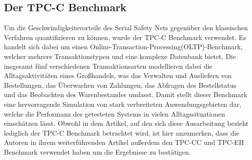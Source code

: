 \subsection{Der TPC-C Benchmark}
Um die Geschwindigkeitsvorteile des Serial Safety Nets gegenüber den klassischen Verfahren quantifizieren zu können, wurde der TPC-C Benchmark verwendet.\cite{tpcc}
Es handelt sich dabei um einen Online-Transaction-Processing(OLTP)-Benchmark, welcher mehrere Transaktionstypen und eine komplexe Datenbank bietet.
Die insgesamt fünf verschiedenen Transaktionsarten modellieren dabei die Alltagsaktivitäten eines Großhandels, was das Verwalten und Ausliefern von Bestellungen, das Überwachen von Zahlungen, das Abfragen des Bestellstatus und das Beobachten des Warenbestandes umfasst.
Damit stellt dieser Benchmark eine hervorragende Simulation von stark verbreiteten Anwendungsgebieten dar, welche die Performanz des getesteten Systems in vielen Alltagssituationen einschätzen lässt.
Obwohl in dem Artikel, auf den sich diese Ausarbeitung bezieht \cite{Wang:2015} lediglich der TPC-C Benchmark betrachtet wird, ist hier anzumerken, dass die Autoren in ihrem weiterführenden Artikel \cite{WangJFP16} außerdem den TPC-CC und TPC-EH Benchmark verwendet haben um die Ergebnisse zu bestätigen.
